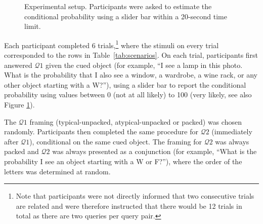 \begin{figure}
\centering
{}
\caption{Experimental setup. Participants were asked to estimate the conditional probability using a slider bar within a 20-second time limit.}
\label{fig:screenshot}
\end{figure}

Each participant completed 6 trials,\footnote{Note that participants were not directly informed that two consecutive trials are related and were therefore instructed that there would be 12 trials in total as there are two queries per query pair.} where the stimuli on every trial corresponded to the rows in Table~\ref{tab:scenarios}. On each trial, participants first answered $\mathcal{Q}1$ given the cued object (for example, ``I see a lamp in this photo. What is the probability that I also see a window, a wardrobe, a wine rack, or any other object starting with a W?''), using a slider bar to report the conditional probability using values between 0 (not at all likely) to 100 (very likely, see also Figure \ref{fig:screenshot}).

The $\mathcal{Q}1$ framing (typical-unpacked, atypical-unpacked or packed) was chosen randomly. Participants then completed the same procedure for $\mathcal{Q}2$ (immediately after $\mathcal{Q}1$), conditional on the same cued object. The framing for $\mathcal{Q}2$ was always packed and $\mathcal{Q}2$ was always presented as a conjunction (for example, ``What is the probability I see an object starting with a W or F?''), where the order of the letters was determined at random.

